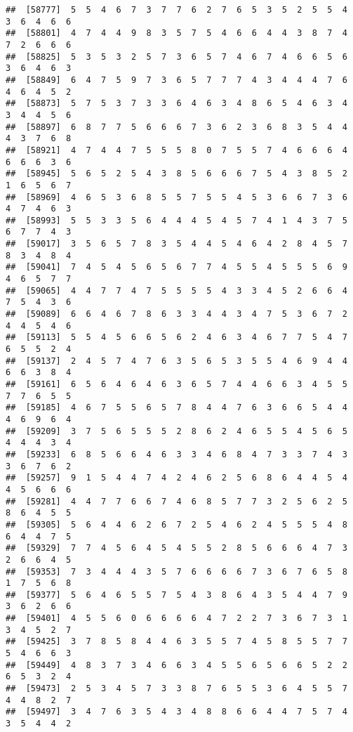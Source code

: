 \documentclass[
]{book}
\begin{document}
\begin{verbatim}
##  [58777]  5  5  4  6  7  3  7  7  6  2  7  6  5  3  5  2  5  5  4  3  6  4  6  6
##  [58801]  4  7  4  4  9  8  3  5  7  5  4  6  6  4  4  3  8  7  4  7  2  6  6  6
##  [58825]  5  3  5  3  2  5  7  3  6  5  7  4  6  7  4  6  6  5  6  3  6  4  6  3
##  [58849]  6  4  7  5  9  7  3  6  5  7  7  7  4  3  4  4  4  7  6  4  6  4  5  2
##  [58873]  5  7  5  3  7  3  3  6  4  6  3  4  8  6  5  4  6  3  4  3  4  4  5  6
##  [58897]  6  8  7  7  5  6  6  6  7  3  6  2  3  6  8  3  5  4  4  4  3  7  6  8
##  [58921]  4  7  4  4  7  5  5  5  8  0  7  5  5  7  4  6  6  6  4  6  6  6  3  6
##  [58945]  5  6  5  2  5  4  3  8  5  6  6  6  7  5  4  3  8  5  2  1  6  5  6  7
##  [58969]  4  6  5  3  6  8  5  5  7  5  5  4  5  3  6  6  7  3  6  4  7  4  6  3
##  [58993]  5  5  3  3  5  6  4  4  4  5  4  5  7  4  1  4  3  7  5  6  7  7  4  3
##  [59017]  3  5  6  5  7  8  3  5  4  4  5  4  6  4  2  8  4  5  7  8  3  4  8  4
##  [59041]  7  4  5  4  5  6  5  6  7  7  4  5  5  4  5  5  5  6  9  4  6  5  7  7
##  [59065]  4  4  7  7  4  7  5  5  5  5  4  3  3  4  5  2  6  6  4  7  5  4  3  6
##  [59089]  6  6  4  6  7  8  6  3  3  4  4  3  4  7  5  3  6  7  2  4  4  5  4  6
##  [59113]  5  5  4  5  6  6  5  6  2  4  6  3  4  6  7  7  5  4  7  6  5  5  2  4
##  [59137]  2  4  5  7  4  7  6  3  5  6  5  3  5  5  4  6  9  4  4  6  6  3  8  4
##  [59161]  6  5  6  4  6  4  6  3  6  5  7  4  4  6  6  3  4  5  5  7  7  6  5  5
##  [59185]  4  6  7  5  5  6  5  7  8  4  4  7  6  3  6  6  5  4  4  4  6  9  6  4
##  [59209]  3  7  5  6  5  5  5  2  8  6  2  4  6  5  5  4  5  6  5  4  4  4  3  4
##  [59233]  6  8  5  6  6  4  6  3  3  4  6  8  4  7  3  3  7  4  3  3  6  7  6  2
##  [59257]  9  1  5  4  4  7  4  2  4  6  2  5  6  8  6  4  4  5  4  4  5  6  6  6
##  [59281]  4  4  7  7  6  6  7  4  6  8  5  7  7  3  2  5  6  2  5  8  6  4  5  5
##  [59305]  5  6  4  4  6  2  6  7  2  5  4  6  2  4  5  5  5  4  8  6  4  4  7  5
##  [59329]  7  7  4  5  6  4  5  4  5  5  2  8  5  6  6  6  4  7  3  2  6  6  4  5
##  [59353]  7  3  4  4  4  3  5  7  6  6  6  6  7  3  6  7  6  5  8  1  7  5  6  8
##  [59377]  5  6  4  6  5  5  7  5  4  3  8  6  4  3  5  4  4  7  9  3  6  2  6  6
##  [59401]  4  5  5  6  0  6  6  6  6  4  7  2  2  7  3  6  7  3  1  3  4  5  2  7
##  [59425]  3  7  8  5  8  4  4  6  3  5  5  7  4  5  8  5  5  7  7  5  4  6  6  3
##  [59449]  4  8  3  7  3  4  6  6  3  4  5  5  6  5  6  6  5  2  2  6  5  3  2  4
##  [59473]  2  5  3  4  5  7  3  3  8  7  6  5  5  3  6  4  5  5  7  4  4  8  2  7
##  [59497]  3  4  7  6  3  5  4  3  4  8  8  6  6  4  4  7  5  7  4  3  5  4  4  2

\end{verbatim}
\end{document}
